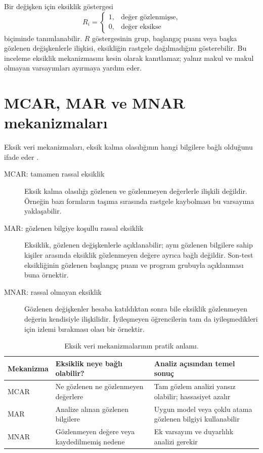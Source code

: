 Bir değişken için eksiklik göstergesi
\[
R_i=
\begin{cases}
1, & \text{değer gözlenmişse},\\
0, & \text{değer eksikse}
\end{cases}
\]
biçiminde tanımlanabilir. $R$ göstergesinin grup, başlangıç puanı veya başka
gözlenen değişkenlerle ilişkisi, eksikliğin rastgele dağılmadığını gösterebilir.
Bu inceleme eksiklik mekanizmasını kesin olarak kanıtlamaz; yalnız makul ve
makul olmayan varsayımları ayırmaya yardım eder.

\section{MCAR, MAR ve MNAR mekanizmaları}

Eksik veri mekanizmaları, eksik kalma olasılığının hangi bilgilere bağlı
olduğunu ifade eder \cite{rubin1976,little2019,vanbuuren2018}.

\begin{description}
  \item[MCAR: tamamen rassal eksiklik] Eksik kalma olasılığı gözlenen ve
  gözlenmeyen değerlerle ilişkili değildir. Örneğin bazı formların taşıma
  sırasında rastgele kaybolması bu varsayıma yaklaşabilir.
  \item[MAR: gözlenen bilgiye koşullu rassal eksiklik] Eksiklik, gözlenen
  değişkenlerle açıklanabilir; aynı gözlenen bilgilere sahip kişiler arasında
  eksiklik gözlenmeyen değere ayrıca bağlı değildir. Son-test eksikliğinin
  gözlenen başlangıç puanı ve program grubuyla açıklanması buna örnektir.
  \item[MNAR: rassal olmayan eksiklik] Gözlenen değişkenler hesaba katıldıktan
  sonra bile eksiklik gözlenmeyen değerin kendisiyle ilişkilidir. İyileşmeyen
  öğrencilerin tam da iyileşmedikleri için izlemi bırakması olası bir örnektir.
\end{description}

\begin{table}[htbp]
\centering
\caption{Eksik veri mekanizmalarının pratik anlamı.}
\begin{tabular}{@{}p{}p{}p{}@{}}
\toprule
Mekanizma & Eksiklik neye bağlı olabilir? & Analiz açısından temel sonuç \\
\midrule
MCAR & Ne gözlenen ne gözlenmeyen değerlere & Tam gözlem analizi yansız olabilir; hassasiyet azalır \\
MAR & Analize alınan gözlenen bilgilere & Uygun model veya çoklu atama gözlenen bilgiyi kullanabilir \\
MNAR & Gözlenmeyen değere veya kaydedilmemiş nedene & Ek varsayım ve duyarlılık analizi gerekir \\
\bottomrule
\end{tabular}
\end{table}

